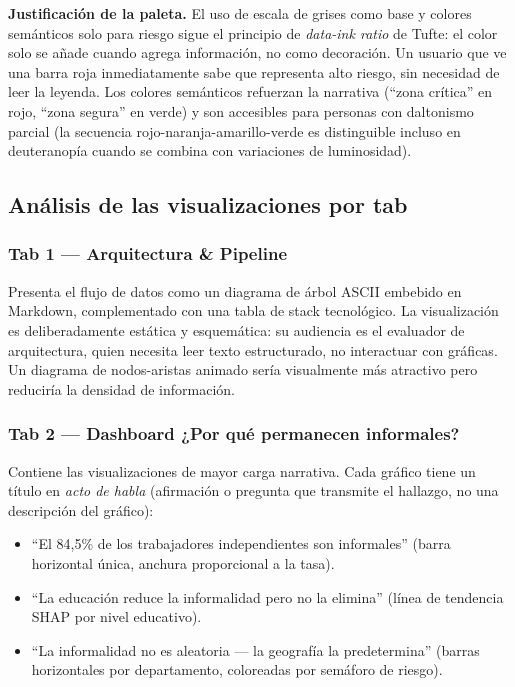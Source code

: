 \documentclass[12pt, a4paper]{article}
\begin{document}
\begin{decision}
\textbf{Justificación de la paleta.} El uso de escala de grises como base y colores
semánticos solo para riesgo sigue el principio de \textit{data-ink ratio} de Tufte:
el color solo se añade cuando agrega información, no como decoración. Un usuario que
ve una barra roja inmediatamente sabe que representa alto riesgo, sin necesidad de
leer la leyenda. Los colores semánticos refuerzan la narrativa (``zona crítica'' en rojo,
``zona segura'' en verde) y son accesibles para personas con daltonismo parcial
(la secuencia rojo-naranja-amarillo-verde es distinguible incluso en deuteranopía
cuando se combina con variaciones de luminosidad).
\end{decision}

\subsection{Análisis de las visualizaciones por tab}

\subsubsection{Tab 1 — Arquitectura \& Pipeline}

Presenta el flujo de datos como un diagrama de árbol ASCII embebido en Markdown,
complementado con una tabla de stack tecnológico. La visualización es deliberadamente
estática y esquemática: su audiencia es el evaluador de arquitectura, quien necesita
leer texto estructurado, no interactuar con gráficas. Un diagrama de nodos-aristas
animado sería visualmente más atractivo pero reduciría la densidad de información.

\subsubsection{Tab 2 — Dashboard ¿Por qué permanecen informales?}

Contiene las visualizaciones de mayor carga narrativa. Cada gráfico tiene un título
en \textit{acto de habla} (afirmación o pregunta que transmite el hallazgo, no
una descripción del gráfico):

\begin{itemize}[noitemsep]
  \item ``El 84{,}5\% de los trabajadores independientes son informales''
  (barra horizontal única, anchura proporcional a la tasa).
  \item ``La educación reduce la informalidad pero no la elimina''
  (línea de tendencia SHAP por nivel educativo).
  \item ``La informalidad no es aleatoria — la geografía la predetermina''
  (barras horizontales por departamento, coloreadas por semáforo de riesgo).
\end{itemize}
\end{document}
